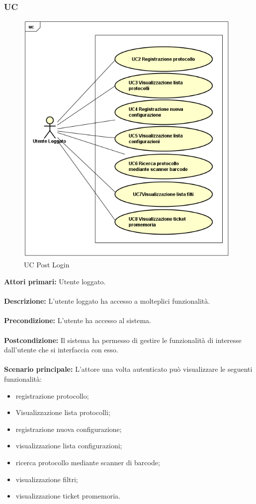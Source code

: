     \subsubsection{UC}
    \label{UC}
    \begin{figure}[!h] 
        \centering 
        \includegraphics[width = 11cm]{immagini/UseCase/postlogin.png}
        \caption{UC Post Login}
    \end{figure}
    
    \textbf{Attori primari:} Utente loggato.
    \\
    \\
    \textbf{Descrizione:} L'utente loggato ha accesso a molteplici funzionalità.
    \\
    \\
    \textbf{Precondizione:} L'utente ha accesso al sistema.
    \\
    \\
    \textbf{Postcondizione:} Il sistema ha permesso di gestire le funzionalità di interesse dall'utente che si interfaccia con esso.
    \\
    \\
    \textbf{Scenario principale:} L'attore una volta autenticato può visualizzare le seguenti funzionalità:
            \begin{itemize}
                \item registrazione protocollo;
                \item Visualizzazione lista protocolli;
                \item registrazione nuova configurazione;
                \item visualizzazione lista configurazioni;
                \item ricerca protocollo mediante scanner di barcode;
                \item visualizzazione filtri;
                \item visualizzazione ticket promemoria.
            \end{itemize}


